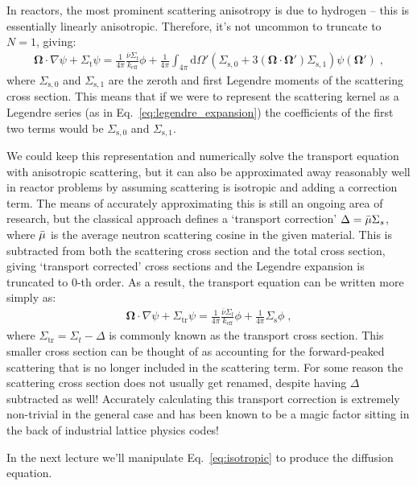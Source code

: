 \documentclass{article}
\begin{document}
In reactors, the most prominent scattering anisotropy is due to hydrogen -- this is essentially linearly anisotropic. Therefore, it's not uncommon to truncate to $N=1$, giving:
\begin{equation}\label{eq:linear_anisotropy}
    \begin{split}
 \mathbf{\Omega}\cdot\nabla\psi + \Sigma_\mathrm{t}\psi
    =\frac{1}{4\pi}\frac{\bar{\nu}\Sigma_\mathrm{f}}{ k_\mathrm{eff}}\phi + \frac{1}{4\pi}\int_{4\pi}\mathrm{d}\Omega' \left(\Sigma_{\mathrm{s},0} + 3\left(\mathbf{\Omega}\cdot\mathbf{\Omega}'\right)\Sigma_{\mathrm{s},1}\right)\psi(\mathbf{\Omega}')\;\mathrm{,}
    \end{split}
\end{equation}
where $\Sigma_{\mathrm{s},0}$ and $\Sigma_{\mathrm{s},1}$ are the zeroth and first Legendre moments of the scattering cross section. This means that if we were to represent the scattering kernel as a Legendre series (as in Eq.~\eqref{eq:legendre_expansion}) the coefficients of the first two terms would be $\Sigma_{\mathrm{s},0}$ and $\Sigma_{\mathrm{s},1}$. %

We could keep this representation and numerically solve the transport equation with anisotropic scattering, but it can also be approximated away reasonably well in reactor problems by assuming scattering is isotropic and adding a correction term. The means of accurately approximating this is still an ongoing area of research, but the classical approach defines a `transport correction' $\Delta = \Bar{\mu}\Sigma_s$, where $\Bar{\mu}$ is the average neutron scattering cosine in the given material. This is subtracted from both the scattering cross section and the total cross section, giving `transport corrected' cross sections and the Legendre expansion is truncated to 0-th order. As a result, the transport equation can be written more simply as:
\begin{equation}\label{eq:isotropic}
    \begin{split}
 \mathbf{\Omega}\cdot\nabla\psi + \Sigma_\mathrm{tr}\psi
    =\frac{1}{4\pi}\frac{\bar{\nu}\Sigma_\mathrm{f}}{ k_\mathrm{eff}}\phi + \frac{1}{4\pi}\Sigma_\mathrm{s}\phi\;\mathrm{,}
    \end{split}
\end{equation}
where $\Sigma_\mathrm{tr} = \Sigma_t - \Delta$ is commonly known as the transport cross section. This smaller cross section can be thought of as accounting for the forward-peaked scattering that is no longer included in the scattering term. For some reason the scattering cross section does not usually get renamed, despite having $\Delta$ subtracted as well! Accurately calculating this transport correction is extremely non-trivial in the general case and has been known to be a magic factor sitting in the back of industrial lattice physics codes!

In the next lecture we'll manipulate Eq.~\eqref{eq:isotropic} to produce the diffusion equation.

\printbibliography
\end{document}
